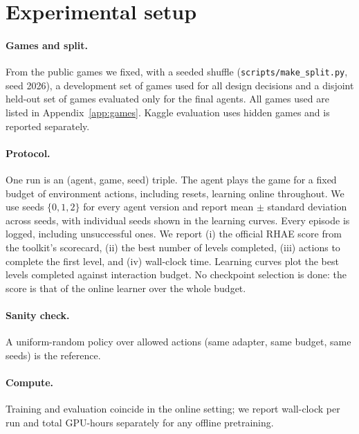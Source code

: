 \section{Experimental setup}\label{sec:setup}

\paragraph{Games and split.} From the  public games we fixed, with a
seeded shuffle (\texttt{scripts/make\_split.py}, seed 2026), a development set
of  games used for all design decisions and a disjoint held-out
set of  games evaluated only for the final agents. All games used
are listed in Appendix~\ref{app:games}. Kaggle evaluation uses hidden games and
is reported separately.

\paragraph{Protocol.} One run is an (agent, game, seed) triple. The agent plays
the game for a fixed budget of  environment actions, including
resets, learning online throughout. We use seeds $\{0,1,2\}$ for every agent
version and report mean $\pm$ standard deviation across seeds, with individual
seeds shown in the learning curves. Every episode is logged, including
unsuccessful ones. We report (i) the official RHAE score from the toolkit's
scorecard, (ii) the best number of levels completed, (iii) actions to complete
the first level, and (iv) wall-clock time. Learning curves plot the best
levels completed against interaction budget. No checkpoint selection is done:
the score is that of the online learner over the whole budget.

\paragraph{Sanity check.} A uniform-random policy over allowed actions
(same adapter, same budget, same seeds) is the reference.

\paragraph{Compute.}  Training and
evaluation coincide in the online setting; we report wall-clock per run and
total GPU-hours separately for any offline pretraining.

